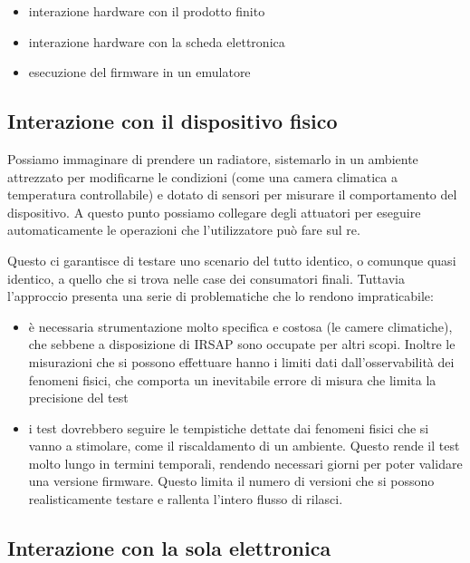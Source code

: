 \documentclass[12pt,a4paper,twoside,titlepage]{book}
\begin{document}
\begin{itemize}
    \item interazione hardware con il prodotto finito
    \item interazione hardware con la scheda elettronica
    \item esecuzione del \gls{firmware} in un emulatore
\end{itemize}

\subsection{Interazione con il dispositivo fisico}

Possiamo immaginare di prendere un radiatore, sistemarlo in un ambiente attrezzato per 
modificarne le condizioni (come una camera climatica a temperatura controllabile) e dotato 
di sensori per misurare il comportamento del dispositivo. A questo punto possiamo collegare degli 
attuatori per eseguire automaticamente le operazioni che l'utilizzatore può fare sul \acrshort{re}. 

Questo ci garantisce di testare uno scenario del tutto identico, o comunque quasi identico, a quello  
che si trova nelle case dei consumatori finali. Tuttavia l'approccio presenta una serie di problematiche 
che lo rendono impraticabile:
\begin{itemize}
    \item è necessaria strumentazione molto specifica e costosa (le camere climatiche),
        che sebbene a disposizione di IRSAP sono occupate per altri scopi. Inoltre le misurazioni che si 
        possono effettuare hanno i limiti dati dall'osservabilità dei fenomeni fisici, che comporta un 
        inevitabile errore di misura che limita la precisione del test

    \item i test dovrebbero seguire le tempistiche dettate dai fenomeni fisici che si vanno a stimolare, 
        come il riscaldamento di un ambiente. Questo rende il test molto lungo in termini temporali, 
        rendendo necessari giorni per poter validare una versione firmware. Questo limita il numero di 
        versioni che si possono realisticamente testare e rallenta l'intero flusso di rilasci. 
\end{itemize}

\subsection{Interazione con la sola elettronica}
\end{document}
